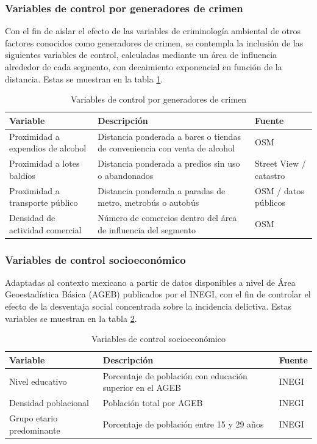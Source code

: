 \subsubsection{Variables de control por generadores de crimen}

Con el fin de aislar el efecto de las variables de criminología ambiental de otros factores conocidos como generadores de crimen, se contempla la inclusión de las siguientes variables de control, calculadas mediante un área de influencia alrededor de cada segmento, con decaimiento exponencial en función de la distancia. Estas se muestran en la tabla \ref{tab:variables-control}.

\begin{table}[htbp]
\centering
\caption{Variables de control por generadores de crimen}
\label{tab:variables-control}
\begin{tabular}{|p{3cm}|p{6cm}|p{3cm}|}
\hline
\textbf{Variable} & \textbf{Descripción} & \textbf{Fuente} \\ \hline
Proximidad a expendios de alcohol & Distancia ponderada a bares o tiendas de conveniencia con venta de alcohol & OSM \\ \hline
Proximidad a lotes baldíos & Distancia ponderada a predios sin uso o abandonados & Street View / catastro \\ \hline
Proximidad a transporte público & Distancia ponderada a paradas de metro, metrobús o autobús & OSM / datos públicos \\ \hline
Densidad de actividad comercial & Número de comercios dentro del área de influencia del segmento & OSM \\ \hline
\end{tabular}
\end{table}

\subsubsection{Variables de control socioeconómico}

Adaptadas al contexto mexicano a partir de datos disponibles a nivel de Área Geoestadística Básica (AGEB) publicados por el INEGI, con el fin de controlar el efecto de la desventaja social concentrada sobre la incidencia delictiva. Estas variables se muestran en la tabla \ref{tab:variables-control-socioeconomico}.

\begin{table}[htbp]
\centering
\caption{Variables de control socioeconómico}
\label{tab:variables-control-socioeconomico}
\begin{tabular}{|p{3cm}|p{6cm}|p{3cm}|}
\hline
\textbf{Variable} & \textbf{Descripción} & \textbf{Fuente} \\ \hline
Nivel educativo & Porcentaje de población con educación superior en el AGEB & INEGI \\ \hline
Densidad poblacional & Población total por AGEB & INEGI \\ \hline
Grupo etario predominante & Porcentaje de población entre 15 y 29 años & INEGI \\ \hline
\end{tabular}
\end{table}

